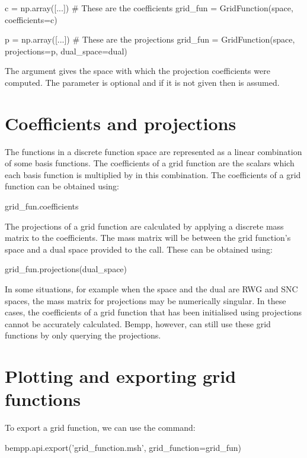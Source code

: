 \documentclass[a4paper]{book}
\begin{document}
\begin{python}
c = np.array([...])  # These are the coefficients
grid_fun = GridFunction(space, coefficients=c)

p = np.array([...])  # These are the projections
grid_fun = GridFunction(space, projections=p, dual_space=dual)
\end{python}

The argument  gives the space with which the projection coefficients were computed.
The parameter is optional and if it is not given then  is assumed.

\section{ Coefficients and projections}The functions in a discrete function space are represented as a linear combination of some basis
functions. The coefficients of a grid function are the scalars which each basis function
is multiplied by in this combination. The coefficients of a grid function can be obtained using:

\begin{python}
grid_fun.coefficients
\end{python}

The projections of a grid function are calculated by applying a discrete mass matrix to the
coefficients. The mass matrix will be between the grid function's space and a dual space
provided to the  call. These can be obtained using:

\begin{python}
grid_fun.projections(dual_space)
\end{python}

In some situations, for example when the space and the dual are RWG and SNC spaces, the mass matrix
for projections may be numerically singular. In these cases, the coefficients of a grid function
that has been initialised using projections cannot be accurately calculated. Bempp, however, can
still use these grid functions by only querying the projections.

\section{ Plotting and exporting grid functions}To export a grid function, we can use the  command:

\begin{python}
bempp.api.export('grid_function.msh', grid_function=grid_fun)
\end{python}
\end{document}
